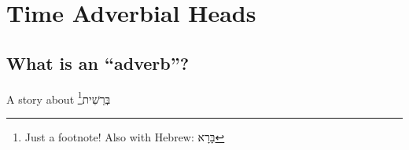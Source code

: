 
\chapter{Time Adverbial Heads}  %



\section{What is an ``adverb''?}

A story about \texthebrew{בְּרֵשִׁית}\footnote{Just a footnote! Also with Hebrew: \texthebrew{בָּרָא}}

\begin{adjustbox}{width=1\textwidth}

\end{adjustbox}
